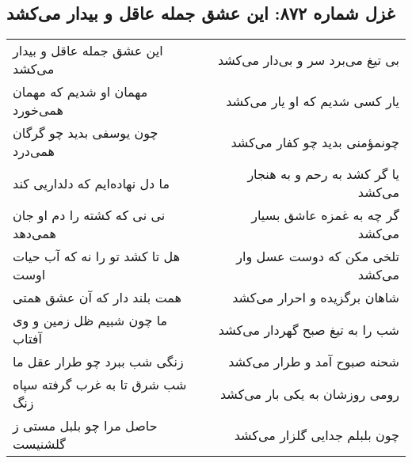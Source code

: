 \begin{center}
\section*{غزل شماره ۸۷۲: این عشق جمله عاقل و بیدار می‌کشد}
\label{sec:0872}
\begin{longtable}{l p{0.5cm} r}
این عشق جمله عاقل و بیدار می‌کشد
&&
بی تیغ می‌برد سر و بی‌دار می‌کشد
\\
مهمان او شدیم که مهمان همی‌خورد
&&
یار کسی شدیم که او یار می‌کشد
\\
چون یوسفی بدید چو گرگان همی‌درد
&&
چونمؤمنی بدید چو کفار می‌کشد
\\
ما دل نهاده‌ایم که دلداریی کند
&&
یا گر کشد به رحم و به هنجار می‌کشد
\\
نی نی که کشته را دم او جان همی‌دهد
&&
گر چه به غمزه عاشق بسیار می‌کشد
\\
هل تا کشد تو را نه که آب حیات اوست
&&
تلخی مکن که دوست عسل وار می‌کشد
\\
همت بلند دار که آن عشق همتی
&&
شاهان برگزیده و احرار می‌کشد
\\
ما چون شبیم ظل زمین و وی آفتاب
&&
شب را به تیغ صبح گهردار می‌کشد
\\
زنگی شب ببرد چو طرار عقل ما
&&
شحنه صبوح آمد و طرار می‌کشد
\\
شب شرق تا به غرب گرفته سپاه زنگ
&&
رومی روزشان به یکی بار می‌کشد
\\
حاصل مرا چو بلبل مستی ز گلشنیست
&&
چون بلبلم جدایی گلزار می‌کشد
\\
\end{longtable}
\end{center}
